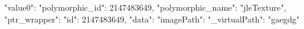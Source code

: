 {
    "value0": {
        "polymorphic_id": 2147483649,
        "polymorphic_name": "jleTexture",
        "ptr_wrapper": {
            "id": 2147483649,
            "data": {
                "imagePath": {
                    "_virtualPath": "gaegdg"
                }
            }
        }
    }
}
